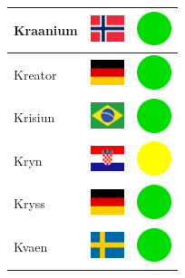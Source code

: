 \documentclass[12pt, a4paper, twoside]{report}
\begin{document}
\begin{center}
\begin{longtable}{|p{5cm}|p{2cm}|p{2cm}|}
 Kraanium                                                   & \includegraphics[width=1cm]{../img/flags/no} &   \includegraphics[width=1cm]{../likes/y} \\ \hline
 Kreator                                                    & \includegraphics[width=1cm]{../img/flags/de} &   \includegraphics[width=1cm]{../likes/y} \\ \hline
 Krisiun                                                    & \includegraphics[width=1cm]{../img/flags/br} &   \includegraphics[width=1cm]{../likes/y} \\ \hline
 Kryn                                                       & \includegraphics[width=1cm]{../img/flags/hr} &   \includegraphics[width=1cm]{../likes/m} \\ \hline
 Kryss                                                      & \includegraphics[width=1cm]{../img/flags/de} &   \includegraphics[width=1cm]{../likes/y} \\ \hline
 Kvaen                                                      & \includegraphics[width=1cm]{../img/flags/se} &   \includegraphics[width=1cm]{../likes/y} \\ \hline

\end{longtable}
\end{center}
\end{document}
